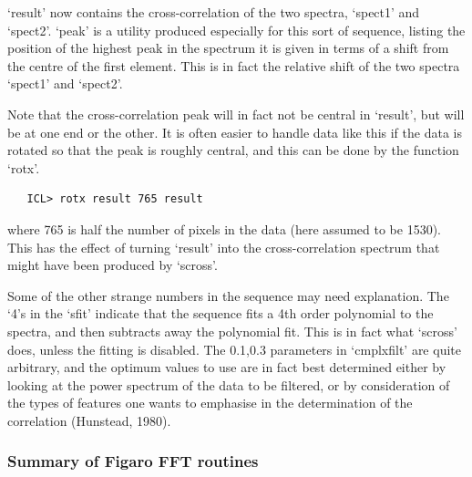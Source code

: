    `result' now contains the cross-correlation of the two spectra,
   `spect1' and `spect2'.  `peak' is a utility produced especially for
   this sort of sequence, listing the position of the highest peak in
   the spectrum it is given in terms of a shift from the centre of the
   first element.  This is in fact the relative shift of the two spectra
   `spect1' and `spect2'.

   Note that the cross-correlation peak will in fact not be central in
   `result', but will be at one end or the other.  It is often easier to
   handle data like this if the data is rotated so that the peak is
   roughly central, and this can be done by the function `rotx'.

\begin{verbatim}
   ICL> rotx result 765 result
\end{verbatim}

   where 765 is half the number of pixels in the data (here assumed to
   be 1530).  This has the effect of turning `result' into the
   cross-correlation spectrum that might have been produced by `scross'.

   Some of the other strange numbers in the sequence may need
   explanation. The `4's in the `sfit' indicate that the sequence fits a
   4th order polynomial to the spectra, and then subtracts away the
   polynomial fit.  This is in fact what `scross' does, unless the
   fitting is disabled.  The 0.1,0.3 parameters in `cmplxfilt' are quite
   arbitrary, and the optimum values to use are in fact best determined
   either by looking at the power spectrum of the data to be filtered,
   or by consideration of the types of features one wants to emphasise
   in the determination of the correlation (Hunstead, 1980).


\subsubsection{\label{techno6summary}Summary of Figaro FFT routines}


